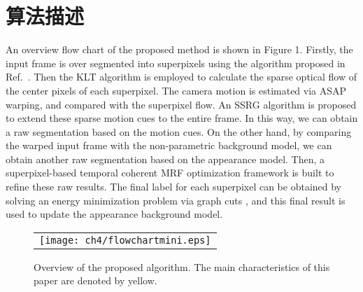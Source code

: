  \section{算法描述}
 \label{ch4:sec:algorithm}
 An overview flow chart of the proposed method is shown in Figure 1. Firstly, the input frame is over segmented into superpixels using the algorithm proposed in Ref.~. Then the KLT algorithm \cite{KLT} is employed to calculate the sparse optical flow of the center pixels of each superpixel. The camera motion is estimated via ASAP warping, and compared with the superpixel flow. An SSRG algorithm is proposed to extend these sparse motion cues to the entire frame. In this way, we can obtain a raw segmentation based on the motion cues. On the other hand, by comparing the warped input frame with the non-parametric background model, we can obtain another raw segmentation based on the appearance model. Then, a superpixel-based temporal coherent MRF optimization framework is built to refine these raw results. The final label for each superpixel can be obtained by solving an energy minimization problem via graph cuts \cite{graphcut04}, and this final result is used to update the appearance background model.

\begin{figure}[!htbp]
\begin{center}
\begin{tabular}{c}
  \texttt{[image: ch4/flowchartmini.eps]}
  \end{tabular}
\end{center}
\caption{Overview of the proposed algorithm. The main characteristics of this paper are denoted by yellow.}
\label{fig:1}       %
\end{figure}



